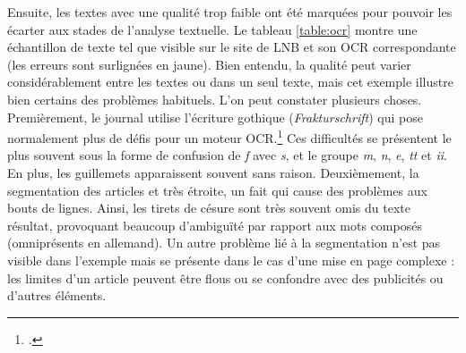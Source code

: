 \documentclass[a4paper,twoside,12pt]{article}
\begin{document}
Ensuite, les textes avec une qualité trop faible ont été marquées pour pouvoir les écarter aux stades de l'analyse textuelle. Le tableau \ref{table:ocr} montre une échantillon de texte tel que visible sur le site de LNB et son OCR correspondante (les erreurs sont surlignées en jaune). Bien entendu, la qualité peut varier considérablement entre les textes ou dans un seul texte, mais cet exemple illustre bien certains des problèmes habituels. L'on peut constater plusieurs choses. Premièrement, le journal utilise l'écriture gothique (\textit{Frakturschrift}) qui pose normalement plus de défis pour un moteur OCR.\footcite[Pour un aperçu des problématiques généraux de l'OCR des textes allemands (quoique avec un accent sur les 17e-18e siècles) et pour l'état de l'art autour du moment de la complétion de la numérisation des catalogues de LNB, cf. ][]{federbusch_volltext_2013} Ces difficultés se présentent le plus souvent sous la forme de confusion de \textit{f} avec \textit{s}, et le groupe \textit{m}, \textit{n}, \textit{e}, \textit{tt} et \textit{ii}. En plus, les guillemets \og \fg{} apparaissent souvent sans raison. Deuxièmement, la segmentation des articles et très étroite, un fait qui cause des problèmes aux bouts de lignes. Ainsi, les tirets de césure sont très souvent omis du texte résultat, provoquant beaucoup d'ambiguïté par rapport aux mots composés (omniprésents en allemand). Un autre problème lié à la segmentation n'est pas visible dans l'exemple mais se présente dans le cas d'une mise en page complexe : les limites d'un article peuvent être flous ou se confondre avec des publicités ou d'autres éléments.
\end{document}
